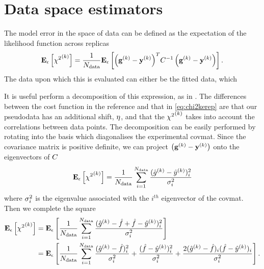 \section{Data space estimators}

The model error in the space of data can be defined as the expectation of the
likelihood function across replicas
\begin{equation}
    \label{eq:chi2kerep}
    \mathbf{E}_{\epsilon}\left[ {\chi^2}^{(k)} \right] = \frac{1}{N_{\rm data}} 
    \mathbf{E}_{\epsilon}\left[  {\left( \mathbf{g}^{(k)} - \mathbf{y}^{(k)} \right)}^{T} C^{-1}_{} \left( \mathbf{g}^{(k)} - \mathbf{y}^{(k)} \right) \right].
\end{equation}
The data upon which this is evaluated can either be the fitted data, which 

It is useful perform a decomposition of this expression, as in \cite{mlforphysics}.
The differences between the cost function in the reference and that in
\eqref{eq:chi2kerep} are that our pseudodata has an additional shift, $\eta$,
and that the ${\chi^2}^{(k)}$ takes into account the correlations between data points.
The decomposition can be easily performed by rotating into the basis which
diagonalises the experimental covmat. Since the covariance matrix is positive
definite, we can project $\left( \mathbf{g}^{(k)} - \mathbf{y}^{(k)} \right)$ onto the eigenvectors of $C$
\begin{equation}
    \mathbf{E}_{\epsilon}\left[ {\chi^2}^{(k)} \right] = \frac{1}{N_{\rm data}} \sum_{i=1}^{N_{\rm data}} \frac{(\hat{g}^{(k)} - \hat{y}^{(k)})_i^2}{\sigma^{2}_i}
\end{equation}
where $\sigma^{2}_i$ is the eigenvalue associated with the $i^{th}$ eigenvector of
the covmat. Then we complete the square
\begin{equation}\label{eq:chi2decomp1}
    \begin{split}
        \mathbf{E}_{\epsilon}\left[ {\chi^2}^{(k)} \right] &=
        \mathbf{E}_{\epsilon}\left[ \frac{1}{N_{\rm data}} \sum_{i=1}^{N_{\rm data}}
            \frac{
                (\hat{g}^{(k)} - \hat{f} + \hat{f} - \hat{y}^{(k)})_i^2
            }{\sigma^{2}_i}  \right] \\
        &= \mathbf{E}_{\epsilon}\left[ \frac{1}{N_{\rm data}} \sum_{i=1}^{N_{\rm data}}
            \frac{(\hat{g}^{(k)} - \hat{f})^2_i}{\sigma^{2}_i} +
            \frac{(\hat{f} - \hat{y}^{(k)})_i^2}{\sigma^{2}_i} +
            \frac{2(\hat{g}^{(k)} - \hat{f})_i(\hat{f} - \hat{y}^{(k)})_i}{\sigma^{2}_i} \right].
    \end{split}
\end{equation}
